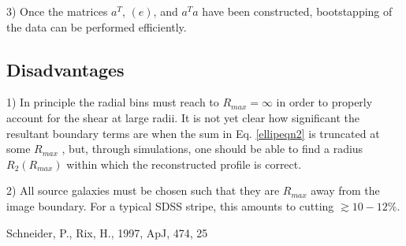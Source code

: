 \documentclass[preprint2]{aastex}
\def\rmax{$R_{max}$ }
\begin{document}
3) Once the matrices $a^{T}$, $(e)$,  and $a^{T}a$ have been constructed, 
   bootstapping of the data can be performed efficiently.

\subsection{Disadvantages}

1) In principle the radial bins must reach to $R_{max}=\infty$ in order to properly
   account for the shear at large radii.  It is not yet clear how significant
   the resultant boundary terms are when the sum in Eq. \ref{ellipeqn2} is 
   truncated at some \rmax, but, through simulations, one should be able to
   find a radius $R_2(R_{max})$ within which the reconstructed profile is
   correct.

2) All source galaxies must be chosen such that they are \rmax away from the
   image boundary.  For a typical SDSS stripe, this amounts to cutting 
   $\gtrsim 10-12\%$.

\acknowledgments

\begin{thebibliography}{}
 Schneider, P., Rix, H., 1997, ApJ, 474, 25
\end{thebibliography}
\end{document}
